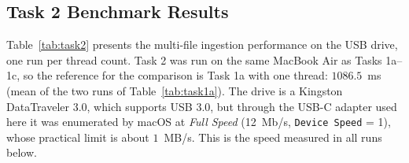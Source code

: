 \documentclass[11pt,a4paper]{article}
\begin{document}
\subsection{Task 2 Benchmark Results}
Table~\ref{tab:task2} presents the multi-file ingestion performance on the USB drive, one run per thread count. Task 2 was run on the same MacBook Air as Tasks 1a--1c, so the reference for the comparison is Task 1a with one thread: $1086.5$~ms (mean of the two runs of Table~\ref{tab:task1a}). The drive is a Kingston DataTraveler 3.0, which supports USB 3.0, but through the USB-C adapter used here it was enumerated by macOS at \emph{Full Speed} (12~Mb/s, \texttt{Device Speed} = 1), whose practical limit is about $1$~MB/s. This is the speed measured in all runs below.

\begin{table}[H]
\centering
\caption{Task 2: USB Drive Multi-File Processing vs. Thread Count (cold cache)}
\label{tab:task2}
\vspace{2mm}
\footnotesize
\setlength{\tabcolsep}{4pt}
\end{table}
\end{document}
